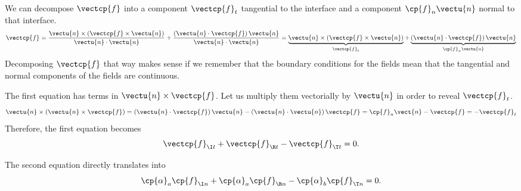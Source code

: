 \begin{refsection}
We can decompose $\vectcp{f}$ into a component $\vectcp{f}_t$ tangential to the interface and a component $\cp{f}_n \vectu{n}$ normal to that interface.
\begin{equation}
    \vectcp{f}
    =
    \frac{
        \vectu{n} \times \left(\vectcp{f} \times \vectu{n}\right)
    }{
        \vectu{n}\cdot\vectu{n}
    }
    +
    \frac{
        \left(\vectu{n} \cdot \vectcp{f}\right)\vectu{n}
    }{
        \vectu{n}\cdot\vectu{n}
    }
    =
    \underbrace{
        \vectu{n} \times \left(\vectcp{f} \times \vectu{n}\right)
    }_{\vectcp{f}_t}
    +
    \underbrace{
        \left(\vectu{n} \cdot \vectcp{f}\right)\vectu{n}
    }_{\cp{f}_n \vectu{n}}
\end{equation}
Decomposing $\vectcp{f}$ that way makes sense if we remember that the boundary conditions for the fields mean that the tangential and normal components of the fields are continuous.

The first equation has terms in $\vectu{n} \times \vectcp{f}$.
Let us multiply them vectorially by $\vectu{n}$ in order to reveal $\vectcp{f}_t$.
\begin{equation}
    \vectu{n} \times \left( \vectu{n} \times \vectcp{f} \right)
    =
    \left( \vectu{n} \cdot \vectcp{f} \right) \vectu{n}
    -
    \left( \vectu{n} \cdot \vectu{n} \right) \vectcp{f}
    =
    \cp{f}_n \vect{n} - \vectcp{f}
    = -\vectcp{f}_t
\end{equation}
Therefore, the first equation becomes
\begin{equation}
    \vectcp{f}_{\I t} + \vectcp{f}_{\R t} - \vectcp{f}_{\T t} = 0
    \text{.}
    \label{eq:boundaries_sum_ft_0}
\end{equation}

The second equation directly translates into
\begin{equation}
    \cp{\alpha}_a \cp{f}_{\I n}
    +
    \cp{\alpha}_a \cp{f}_{\R n}
    -
    \cp{\alpha}_b \cp{f}_{\T n}
    =
    0 
    \text{.}
    \label{eq:boundaries_sum_fn_0}
\end{equation}


\end{refsection}
